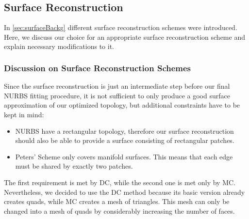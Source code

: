 \subsection{Surface Reconstruction}
\label{ssec:reconstruction}
In \autoref{sec:surfaceBackg} different surface reconstruction schemes were introduced. Here, we discuss our choice for an appropriate surface reconstruction scheme and explain necessary modifications to it.

\subsubsection{Discussion on Surface Reconstruction Schemes}
Since the surface reconstruction is just an intermediate step before our final \ac{NURBS} fitting procedure, it is not sufficient to only produce a good surface approximation of our optimized topology, but additional constraints have to be kept in mind:
\begin{itemize}
\item \ac{NURBS} have a rectangular topology, therefore our surface reconstruction should also be able to provide a surface consisting of rectangular patches.
\item Peters' Scheme only covers manifold surfaces. This means that each edge must be shared by exactly two patches.
\end{itemize}
The first requirement is met by \ac{DC}, while the second one is met only by \ac{MC}. Nevertheless, we decided to use the \ac{DC} method because its basic version already creates \acp{quad}, while \ac{MC} creates a mesh of triangles. This mesh can only be changed into a mesh of \acp{quad} by considerably increasing the number of faces.


